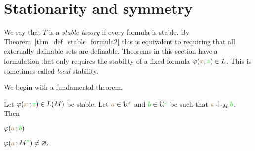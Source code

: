 

\section{Stationarity and symmetry}
\label{stationarity}

\def\ceq#1#2#3{\parbox{20ex}{$\displaystyle #1$}\medrel{#2}$\displaystyle  #3$}

We say that $T$ is a \emph{stable theory\/} if every formula is stable.
By Theorem~\ref{thm_def_stable_formula2} this is equivalent to requiring that all externally definable sets are definable.
Theorems in this section have a formulation that only requires the stability of a fixed formula $\varphi({\color{brown} x},{\color{green} z})\in L$.
This is sometimes called \textit{local\/} stability.

We begin with a fundamental theorem.

\begin{theorem}[ (Symmetry)]\label{thm_symmetry}
  Let $\varphi({\color{brown} x}\,;{\color{green} z})\in L(M)$ be stable.
  Let ${\color{brown} a}\in\EuScript U^{\color{brown} x}$ and ${\color{green} b}\in\EuScript U^{\color{green} z}$ be such that ${\mr a}\cnonfork_M{\gr b}$.
  Then

  \ceq{\hfill\phi({\mr a}\,;{\gr b})}{\IMP}{\phi({\mr a}\,;M^{\gr z})\neq\0.}
\end{theorem}


